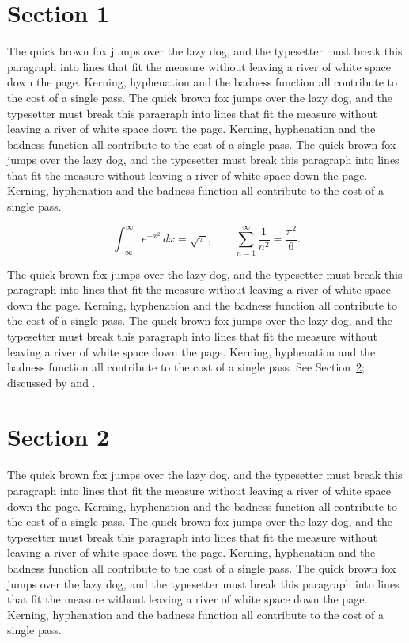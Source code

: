 \documentclass{article}
\begin{document}
\tableofcontents
\section{Section 1}
\label{sec:1}
The quick brown fox jumps over the lazy dog, and the typesetter must break this paragraph into lines that fit the measure without leaving a river of white space down the page. Kerning, hyphenation and the badness function all contribute to the cost of a single pass. The quick brown fox jumps over the lazy dog, and the typesetter must break this paragraph into lines that fit the measure without leaving a river of white space down the page. Kerning, hyphenation and the badness function all contribute to the cost of a single pass. The quick brown fox jumps over the lazy dog, and the typesetter must break this paragraph into lines that fit the measure without leaving a river of white space down the page. Kerning, hyphenation and the badness function all contribute to the cost of a single pass. 

\begin{equation}\label{eq:1}
\int_{-\infty}^{\infty} e^{-x^{2}}\,dx = \sqrt{\pi}, \qquad
\sum_{n=1}^{\infty} \frac{1}{n^{2}} = \frac{\pi^{2}}{6}.
\end{equation}

The quick brown fox jumps over the lazy dog, and the typesetter must break this paragraph into lines that fit the measure without leaving a river of white space down the page. Kerning, hyphenation and the badness function all contribute to the cost of a single pass. The quick brown fox jumps over the lazy dog, and the typesetter must break this paragraph into lines that fit the measure without leaving a river of white space down the page. Kerning, hyphenation and the badness function all contribute to the cost of a single pass. 
See Section~\ref{sec:2}; discussed by \textcite{k2} and \textcite{l4}.
\section{Section 2}
\label{sec:2}
The quick brown fox jumps over the lazy dog, and the typesetter must break this paragraph into lines that fit the measure without leaving a river of white space down the page. Kerning, hyphenation and the badness function all contribute to the cost of a single pass. The quick brown fox jumps over the lazy dog, and the typesetter must break this paragraph into lines that fit the measure without leaving a river of white space down the page. Kerning, hyphenation and the badness function all contribute to the cost of a single pass. The quick brown fox jumps over the lazy dog, and the typesetter must break this paragraph into lines that fit the measure without leaving a river of white space down the page. Kerning, hyphenation and the badness function all contribute to the cost of a single pass. 
\end{document}
